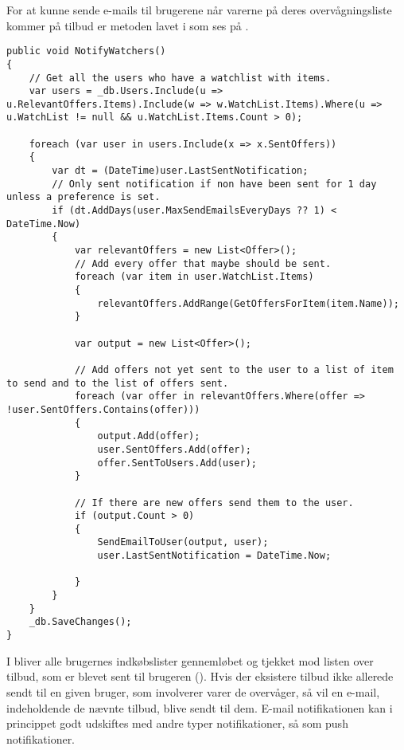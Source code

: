 For at kunne sende e-mails til brugerene når varerne på deres overvågningsliste kommer på tilbud er metoden  lavet i  som ses på . 
\begin{lstlisting}[caption="Metoden ``NotifyWatcher som finder de tilbud som skal sendes til hver user og sender dem.''",label=notifywatcherlisting]
public void NotifyWatchers()
{
    // Get all the users who have a watchlist with items.
    var users = _db.Users.Include(u => u.RelevantOffers.Items).Include(w => w.WatchList.Items).Where(u => u.WatchList != null && u.WatchList.Items.Count > 0);

    foreach (var user in users.Include(x => x.SentOffers))
    {
        var dt = (DateTime)user.LastSentNotification;
        // Only sent notification if non have been sent for 1 day unless a preference is set.
        if (dt.AddDays(user.MaxSendEmailsEveryDays ?? 1) < DateTime.Now)
        {
            var relevantOffers = new List<Offer>();
            // Add every offer that maybe should be sent. 
            foreach (var item in user.WatchList.Items)
            {
                relevantOffers.AddRange(GetOffersForItem(item.Name));
            }

            var output = new List<Offer>();

            // Add offers not yet sent to the user to a list of item to send and to the list of offers sent.
            foreach (var offer in relevantOffers.Where(offer => !user.SentOffers.Contains(offer)))
            {
                output.Add(offer);
                user.SentOffers.Add(offer);
                offer.SentToUsers.Add(user);
            }

            // If there are new offers send them to the user.
            if (output.Count > 0)
            {
                SendEmailToUser(output, user);
                user.LastSentNotification = DateTime.Now;

            }
        }
    }
    _db.SaveChanges();
}
\end{lstlisting}
I  bliver alle brugernes indkøbslister gennemløbet og tjekket mod listen over tilbud, som er blevet sent til brugeren (). 
Hvis der eksistere tilbud ikke allerede sendt til en given bruger, som involverer varer de overvåger, så vil en e-mail, indeholdende de nævnte tilbud, blive sendt til dem. 
E-mail notifikationen kan i princippet godt udskiftes med andre typer notifikationer, så som push notifikationer. %
